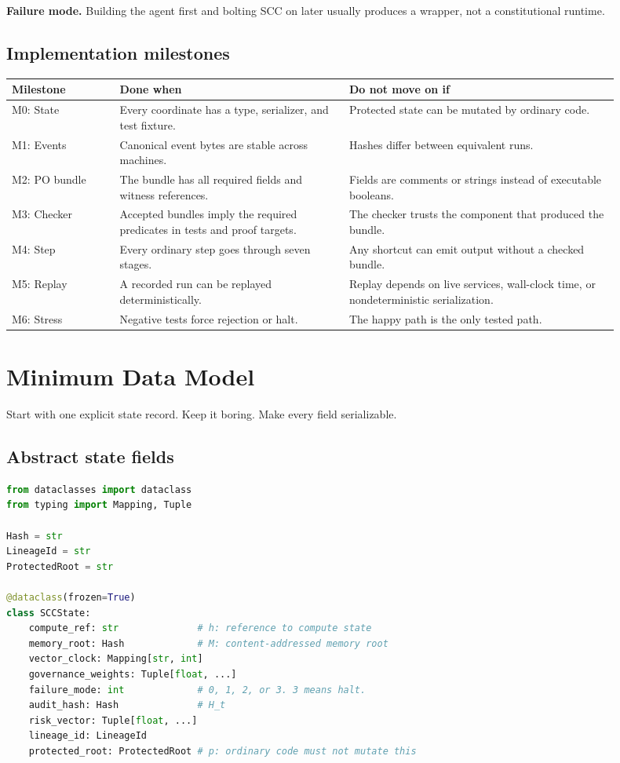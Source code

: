 \documentclass[11pt,oneside]{article}
\newenvironment{warnbox}{\begin{shaded}\noindent\textbf{Failure mode.} }{\end{shaded}}
\begin{document}
\begin{warnbox}
Building the agent first and bolting SCC on later usually produces a wrapper, not a constitutional runtime.
\end{warnbox}

\subsection{Implementation milestones}
\begin{longtable}{@{}p{0.16\linewidth}p{0.34\linewidth}p{0.40\linewidth}@{}}
\toprule
\textbf{Milestone} & \textbf{Done when} & \textbf{Do not move on if} \\
\midrule
M0: State & Every coordinate has a type, serializer, and test fixture. & Protected state can be mutated by ordinary code. \\
M1: Events & Canonical event bytes are stable across machines. & Hashes differ between equivalent runs. \\
M2: PO bundle & The bundle has all required fields and witness references. & Fields are comments or strings instead of executable booleans. \\
M3: Checker & Accepted bundles imply the required predicates in tests and proof targets. & The checker trusts the component that produced the bundle. \\
M4: Step & Every ordinary step goes through seven stages. & Any shortcut can emit output without a checked bundle. \\
M5: Replay & A recorded run can be replayed deterministically. & Replay depends on live services, wall-clock time, or nondeterministic serialization. \\
M6: Stress & Negative tests force rejection or halt. & The happy path is the only tested path. \\
\bottomrule
\end{longtable}

\section{Minimum Data Model}
Start with one explicit state record. Keep it boring. Make every field serializable.

\subsection{Abstract state fields}
\begin{lstlisting}[language=Python,caption={Minimal state record.}]
from dataclasses import dataclass
from typing import Mapping, Tuple

Hash = str
LineageId = str
ProtectedRoot = str

@dataclass(frozen=True)
class SCCState:
    compute_ref: str              # h: reference to compute state
    memory_root: Hash             # M: content-addressed memory root
    vector_clock: Mapping[str, int]
    governance_weights: Tuple[float, ...]
    failure_mode: int             # 0, 1, 2, or 3. 3 means halt.
    audit_hash: Hash              # H_t
    risk_vector: Tuple[float, ...]
    lineage_id: LineageId
    protected_root: ProtectedRoot # p: ordinary code must not mutate this
\end{lstlisting}
\end{document}
